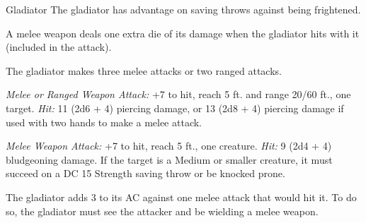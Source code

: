 \documentclass[10pt,a4paper,twoside,twocolumn,openany,nodeprecatedcode]{dndbook}
\begin{document}
\begin{DndMonster}[float=ht]{Gladiator}
\DndMonsterBasics[
armor-class = {16 (studded leather armor)},
hit-points = {\DndDice{15d8 + 45}},
speed = {30 ft.}
]
\DndMonsterAbilityScores[
 str = 18,
 dex = 15,
 con = 16,
 int = 10,
 wis = 12,
 cha = 15
]
\DndMonsterDetails[
saving-throws = {Str +7, Dex +5, Con +6},
skills = {Athletics +10, Intimidation +5},
languages = {any one language (usually Common)},
challenge = 5,
]
The gladiator has advantage on saving throws against being frightened.

A melee weapon deals one extra die of its damage when the gladiator hits with it (included in the attack).

\par
{}
The gladiator makes three melee attacks or two ranged attacks.

\textsl{Melee or Ranged Weapon Attack:} +7 to hit, reach 5 ft. and range 20/60 ft., one target. \textsl{Hit:} 11 (2d6 + 4) piercing damage, or 13 (2d8 + 4) piercing damage if used with two hands to make a melee attack.

\textsl{Melee Weapon Attack:} +7 to hit, reach 5 ft., one creature. \textsl{Hit:} 9 (2d4 + 4) bludgeoning damage. If the target is a Medium or smaller creature, it must succeed on a DC 15 Strength saving throw or be knocked prone.

\par
{}
The gladiator adds 3 to its AC against one melee attack that would hit it. To do so, the gladiator must see the attacker and be wielding a melee weapon.

\end{DndMonster}


\clearpage
{}
\end{document}
